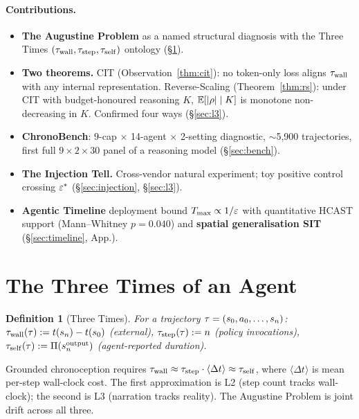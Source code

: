 \documentclass{article}
\newtheorem{definition}{Definition}
\begin{document}
\paragraph{Contributions.}
\begin{itemize}[leftmargin=1.4em, itemsep=1pt, topsep=2pt]
\item \textbf{The Augustine Problem} as a named structural diagnosis with the Three Times $(\tau_{\mathrm{wall}}, \tau_{\mathrm{step}}, \tau_{\mathrm{self}})$ ontology (\S\ref{sec:three}).
\item \textbf{Two theorems.} CIT (Observation~\ref{thm:cit}): no token-only loss aligns $\tau_{\mathrm{wall}}$ with any internal representation. Reverse-Scaling (Theorem~\ref{thm:rs}): under CIT with budget-honoured reasoning $K$, $\mathbb{E}[|\rho|\mid K]$ is monotone non-decreasing in $K$. Confirmed four ways (\S\ref{sec:l3}).
\item \textbf{ChronoBench}: 9-cap $\times$ 14-agent $\times$ 2-setting diagnostic, $\sim$5{,}900 trajectories, first full $9\!\times\!2\!\times\!30$ panel of a reasoning model (\S\ref{sec:bench}).
\item \textbf{The Injection Tell.} Cross-vendor natural experiment; toy positive control crossing $\varepsilon^{*}$ (\S\ref{sec:injection}, \S\ref{sec:l3}).
\item \textbf{Agentic Timeline} deployment bound $T_{\max} \propto 1/\varepsilon$ with quantitative HCAST support (Mann--Whitney $p = 0.040$) and \textbf{spatial generalisation SIT} (\S\ref{sec:timeline}, App.).
\end{itemize}

\section{The Three Times of an Agent}\label{sec:three}

\begin{definition}[Three Times]\label{def:three}
For a trajectory $\tau = (s_0, a_0, \ldots, s_n)$: $\tau_{\mathrm{wall}}(\tau) := t(s_n) - t(s_0)$ (external), $\tau_{\mathrm{step}}(\tau) := n$ (policy invocations), $\tau_{\mathrm{self}}(\tau) := \Pi(s_n^{\text{output}})$ (agent-reported duration).
\end{definition}

Grounded chronoception requires $\tau_{\mathrm{wall}} \approx \tau_{\mathrm{step}} \cdot \langle\Delta t\rangle \approx \tau_{\mathrm{self}}$, where $\langle\Delta t\rangle$ is mean per-step wall-clock cost. The first approximation is L2 (step count tracks wall-clock); the second is L3 (narration tracks reality). The Augustine Problem is joint drift across all three.
\end{document}

